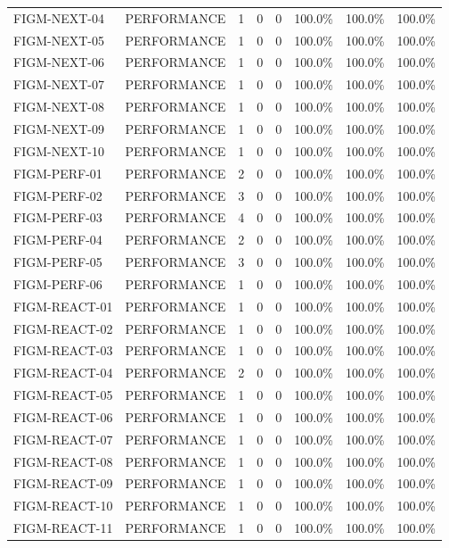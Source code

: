 \begin{table}[htbp]
\begin{tabular}{llcccccc}
FIGM-NEXT-04 & PERFORMANCE & 1 & 0 & 0 & 100.0\% & 100.0\% & 100.0\% \\
FIGM-NEXT-05 & PERFORMANCE & 1 & 0 & 0 & 100.0\% & 100.0\% & 100.0\% \\
FIGM-NEXT-06 & PERFORMANCE & 1 & 0 & 0 & 100.0\% & 100.0\% & 100.0\% \\
FIGM-NEXT-07 & PERFORMANCE & 1 & 0 & 0 & 100.0\% & 100.0\% & 100.0\% \\
FIGM-NEXT-08 & PERFORMANCE & 1 & 0 & 0 & 100.0\% & 100.0\% & 100.0\% \\
FIGM-NEXT-09 & PERFORMANCE & 1 & 0 & 0 & 100.0\% & 100.0\% & 100.0\% \\
FIGM-NEXT-10 & PERFORMANCE & 1 & 0 & 0 & 100.0\% & 100.0\% & 100.0\% \\
FIGM-PERF-01 & PERFORMANCE & 2 & 0 & 0 & 100.0\% & 100.0\% & 100.0\% \\
FIGM-PERF-02 & PERFORMANCE & 3 & 0 & 0 & 100.0\% & 100.0\% & 100.0\% \\
FIGM-PERF-03 & PERFORMANCE & 4 & 0 & 0 & 100.0\% & 100.0\% & 100.0\% \\
FIGM-PERF-04 & PERFORMANCE & 2 & 0 & 0 & 100.0\% & 100.0\% & 100.0\% \\
FIGM-PERF-05 & PERFORMANCE & 3 & 0 & 0 & 100.0\% & 100.0\% & 100.0\% \\
FIGM-PERF-06 & PERFORMANCE & 1 & 0 & 0 & 100.0\% & 100.0\% & 100.0\% \\
FIGM-REACT-01 & PERFORMANCE & 1 & 0 & 0 & 100.0\% & 100.0\% & 100.0\% \\
FIGM-REACT-02 & PERFORMANCE & 1 & 0 & 0 & 100.0\% & 100.0\% & 100.0\% \\
FIGM-REACT-03 & PERFORMANCE & 1 & 0 & 0 & 100.0\% & 100.0\% & 100.0\% \\
FIGM-REACT-04 & PERFORMANCE & 2 & 0 & 0 & 100.0\% & 100.0\% & 100.0\% \\
FIGM-REACT-05 & PERFORMANCE & 1 & 0 & 0 & 100.0\% & 100.0\% & 100.0\% \\
FIGM-REACT-06 & PERFORMANCE & 1 & 0 & 0 & 100.0\% & 100.0\% & 100.0\% \\
FIGM-REACT-07 & PERFORMANCE & 1 & 0 & 0 & 100.0\% & 100.0\% & 100.0\% \\
FIGM-REACT-08 & PERFORMANCE & 1 & 0 & 0 & 100.0\% & 100.0\% & 100.0\% \\
FIGM-REACT-09 & PERFORMANCE & 1 & 0 & 0 & 100.0\% & 100.0\% & 100.0\% \\
FIGM-REACT-10 & PERFORMANCE & 1 & 0 & 0 & 100.0\% & 100.0\% & 100.0\% \\
FIGM-REACT-11 & PERFORMANCE & 1 & 0 & 0 & 100.0\% & 100.0\% & 100.0\% \\

\end{tabular}
\end{table}
